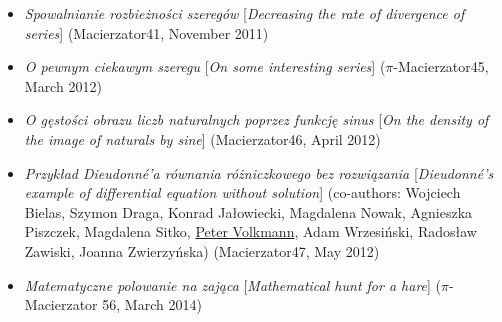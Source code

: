 \begin{itemize}
  \item \textsl{Spowalnianie rozbieżności szeregów} [\textsl{Decreasing the rate of divergence of series}] (Macierzator41, November 2011)
  \item \textsl{O pewnym ciekawym szeregu} [\textsl{On some interesting series}] ($\pi$-Macierzator45, March 2012)
  \item \textsl{O gęstości obrazu liczb naturalnych poprzez funkcję sinus} [\textsl{On the density of the image of naturals by sine}] (Macierzator46, April 2012)
  \item \textsl{Przykład Dieudonné'a równania różniczkowego bez rozwiązania} [\textsl{Dieudonné's example of differential equation without solution}] (co-authors: Wojciech Bielas, Szymon Draga, Konrad Jałowiecki, Magdalena Nowak, Agnieszka Piszczek, Magdalena Sitko, \href{https://www.math.kit.edu/iana2/~volkmann/}{Peter Volkmann}, Adam Wrzesiński, Radosław Zawiski, Joanna Zwierzyńska) (Macierzator47, May 2012)
  \item \textsl{Matematyczne polowanie na zająca} [\textsl{Mathematical hunt for a hare}] ($\pi$-Macierzator 56, March 2014)
\end{itemize}

